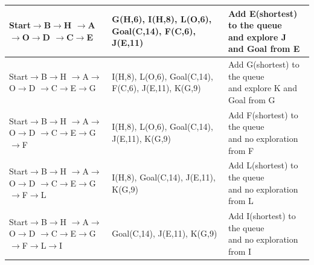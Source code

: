 \documentclass{article}
\begin{document}
\begin{table}[H]
\begin{tabular}{l|l|l}
            \makecell*[c]{Start$\rightarrow$B$\rightarrow$H\\$\rightarrow$A$\rightarrow$O$\rightarrow$D\\$\rightarrow$C$\rightarrow$\textcolor[rgb]{0,1,0}{E}}                 & \textcolor[rgb]{0,0,1}{G(H,6)}, I(H,8), L(O,6), Goal(C,14), F(C,6), J(E,11)    & \makecell*[c]{Add E(shortest) to the queue\\ and explore J and Goal from E} \\ \hline
            \makecell*[c]{Start$\rightarrow$B$\rightarrow$H\\$\rightarrow$A$\rightarrow$O$\rightarrow$D\\$\rightarrow$C$\rightarrow$E$\rightarrow$\textcolor[rgb]{0,0,1}{G}}               & I(H,8), L(O,6), Goal(C,14), F(C,6), J(E,11), K(G,9)    & \makecell*[c]{Add G(shortest) to the queue\\ and explore K and Goal from G} \\ \hline
            \makecell*[c]{Start$\rightarrow$B$\rightarrow$H\\$\rightarrow$A$\rightarrow$O$\rightarrow$D\\$\rightarrow$C$\rightarrow$E$\rightarrow$G\\$\rightarrow$F}             & I(H,8), L(O,6), Goal(C,14), J(E,11), K(G,9)            & \makecell*[c]{Add F(shortest) to the queue\\ and no exploration from F}     \\ \hline
            \makecell*[c]{Start$\rightarrow$B$\rightarrow$H\\$\rightarrow$A$\rightarrow$O$\rightarrow$D\\$\rightarrow$C$\rightarrow$E$\rightarrow$G\\$\rightarrow$F$\rightarrow$L}           & I(H,8), Goal(C,14), J(E,11), K(G,9)                    & \makecell*[c]{Add L(shortest) to the queue\\ and no exploration from L}     \\ \hline
            \makecell*[c]{Start$\rightarrow$B$\rightarrow$H\\$\rightarrow$A$\rightarrow$O$\rightarrow$D\\$\rightarrow$C$\rightarrow$E$\rightarrow$G\\$\rightarrow$F$\rightarrow$L$\rightarrow$I}         & Goal(C,14), J(E,11), \textcolor[rgb]{0,0,1}{K(G,9)}                            & \makecell*[c]{Add I(shortest) to the queue\\ and no exploration from I}     \\ \hline

\end{tabular}
\end{table}
\end{document}
